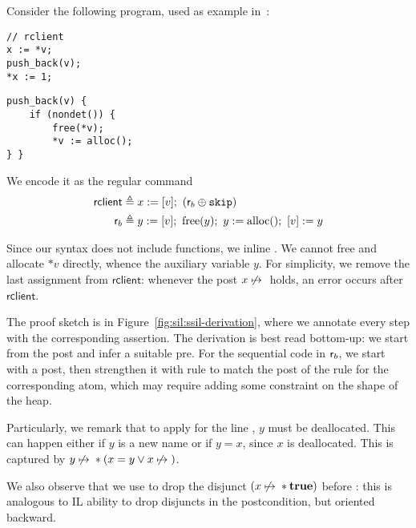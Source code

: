 \begin{example}
	Consider the following program, used as example in~\cite{RBDDOV20}:

	\begin{center}
		\begin{minipage}{0.4\textwidth}
			\begin{verbatim}
// rclient
x := *v;
push_back(v);
*x := 1;

\end{verbatim}
		\end{minipage}\quad
		\begin{minipage}{0.4\textwidth}
			\begin{verbatim}
push_back(v) {
	if (nondet()) {
		free(*v);
		*v := alloc();
} }
\end{verbatim}
		\end{minipage}
	\end{center}

	We encode it as the regular command
	\begin{align*}
		\mathsf{rclient} & \triangleq x := [v];\ (\mathsf{r}_{b} \oplus \texttt{skip})                \\
		\mathsf{r}_{b}        & \triangleq y := [v];\ \text{free}(y);\ y := \text{alloc}();\ [v] := y
	\end{align*}

	Since our syntax does not include functions, we inline .
	We cannot free and allocate $*v$ directly, whence the auxiliary variable $y$. For simplicity,  we remove the last assignment  from $\mathsf{rclient}$: whenever the post $x \not\mapsto{}$ holds, an error occurs after $\mathsf{rclient}$.

	The proof sketch is in Figure~\ref{fig:sil:ssil-derivation}, where we annotate every step with the corresponding assertion.
	The derivation is best read bottom\hyp{}up: we start from the post and infer a suitable pre. For the sequential code in $\mathsf{r}_b$, we start with a post, then strengthen it with rule  to match the post of the rule for the corresponding atom, which may require adding some constraint on the shape of the heap.

	Particularly, we remark that to apply  for the line , $y$ must be deallocated. This can happen either if $y$ is a new name or if $y = x$, since $x$ is deallocated. This is captured by $y \not\mapsto{} * (x = y \lor x \not\mapsto{})$.

	We also observe that we use  to drop the disjunct $(x \not\mapsto{} * \textbf{true})$ before : this is analogous to IL ability to drop disjuncts in the postcondition, but oriented backward.
\end{example}


